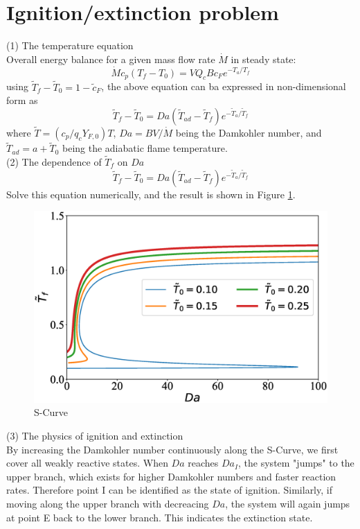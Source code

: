 \documentclass{article}
\begin{document}
\section{Ignition/extinction problem}

(1) The temperature equation\\
Overall energy balance for a given mass flow rate $\dot{M}$ in steady state:
$$
\dot{M}c_p(T_f-T_0)=VQ_cBc_Fe^{-T_a/T_f}
$$
using $\tilde{T}_f-\tilde{T}_0=1-\tilde{c}_F$, the above equation can ba expressed in non-dimensional form as
$$
\tilde{T}_f-\tilde{T}_0=Da(\tilde{T}_{ad} - \tilde{T}_f) e^{-\tilde{T}_a / \tilde{T}_f}
$$
where $\tilde{T}=(c_p/q_cY_{F,0})T$, $Da=BV/\dot{M}$ being the Damkohler number, and $\tilde{T}_{ad}=a+\tilde{T}_0$ being the adiabatic flame temperature.\\

(2) The dependence of $\tilde{T}_f$ on $Da$\\
$$
\tilde{T}_f-\tilde{T}_0=Da(\tilde{T}_{ad} - \tilde{T}_f) e^{-\tilde{T}_a / \tilde{T}_f}
$$
Solve this equation numerically, and the result is shown in Figure \ref{fig:sCurve}.\\

\begin{figure}[htpb]
\centering
\includegraphics[scale=0.36]{sCurve.eps}
\caption{S-Curve}
\label{fig:sCurve}
\end{figure}

(3) The physics of ignition and extinction\\
By increasing the Damkohler number continuously along the S-Curve, we first cover all weakly reactive states. When $Da$ reaches $Da_I$, the system "jumps" to the upper branch, which exists for higher Damkohler numbers and faster reaction rates. Therefore point I can be identified as the state of ignition. Similarly, if moving along the upper branch with decreacing $Da$, the system will again jumps at point E back to the lower branch. This indicates the extinction state.
\end{document}
